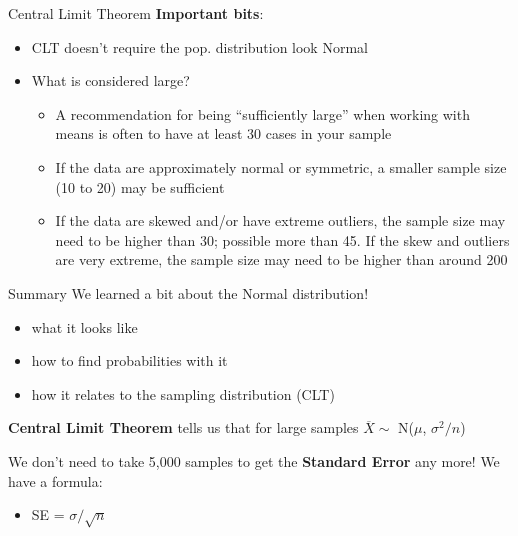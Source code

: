 \documentclass{beamer}
\begin{document}
\begin{frame}{Central Limit Theorem}
    \textbf{Important bits}:

\begin{itemize}
    \item CLT doesn't require the pop. distribution look Normal \vspace{4mm}
    \item What is considered large?
    \begin{itemize}
        \item A recommendation for being “sufficiently large” when working with means is often to have at least 30 cases in your sample \vspace{3mm}
        \item If the data are approximately normal or symmetric, a smaller sample size (10 to 20) may be sufficient  \vspace{3mm}
        \item If the data are skewed and/or have extreme outliers, the sample size may need to be higher than 30; possible more than 45. If the skew and outliers are very extreme, the sample size may need to be higher than around 200
    \end{itemize}
\end{itemize}
\end{frame}

\begin{frame}{Summary}
We learned a bit about the Normal distribution!
\begin{itemize}
    \item what it looks like
    \item how to find probabilities with it
    \item how it relates to the sampling distribution (CLT)
\end{itemize} \vspace{6mm}

\textbf{Central Limit Theorem} tells us that for large samples $\overline{X} \sim$ N($\mu$, $\sigma^2 / n$) \vspace{6mm}

We don't need to take 5,000 samples to get the \textbf{Standard Error} any more! We have a formula:
\begin{itemize}
    \item SE = $\sigma / \sqrt{n}$
\end{itemize}


\end{frame}




%
%
\end{document}

